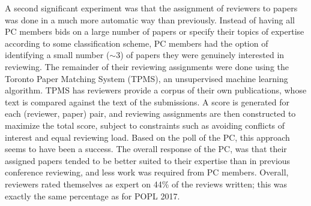 \documentclass[11pt]{article}
\begin{document}
A second significant experiment was that the assignment of
reviewers to papers was done in a much more automatic way than
previously. Instead of having all PC members bids on a large number
of papers or specify their topics of expertise according to some
classification scheme, PC members had the option of identifying a
small number ($\sim\!3$) of papers they were genuinely interested in
reviewing. The remainder of their reviewing assignments were done
using the Toronto Paper Matching System (TPMS), an unsupervised
machine learning algorithm. TPMS has reviewers
provide a corpus of their own publications, whose text is compared
against the text of the submissions. A score is generated for each
(reviewer, paper) pair, and reviewing assignments are then constructed
to maximize the total score, subject to constraints such as
avoiding conflicts of interest and equal reviewing load. Based on
the poll of the PC, this approach seems to have been a success.  The
overall response of the PC, was that their assigned papers tended
to be better suited to their expertise than in previous conference
reviewing, and less work was required from PC members. Overall,
reviewers rated themselves as expert on 44\% of the reviews written;
this was exactly the same percentage as for POPL 2017.
\end{document}
